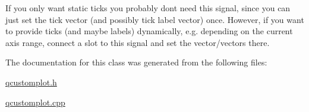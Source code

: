 If you only want static ticks you probably don\textquotesingle{}t need this signal, since you can just set the tick vector (and possibly tick label vector) once. However, if you want to provide ticks (and maybe labels) dynamically, e.\+g. depending on the current axis range, connect a slot to this signal and set the vector/vectors there. 

The documentation for this class was generated from the following files\+:\begin{DoxyCompactItemize}
\item 
\hyperlink{qcustomplot_8h}{qcustomplot.\+h}\item 
\hyperlink{qcustomplot_8cpp}{qcustomplot.\+cpp}\end{DoxyCompactItemize}
